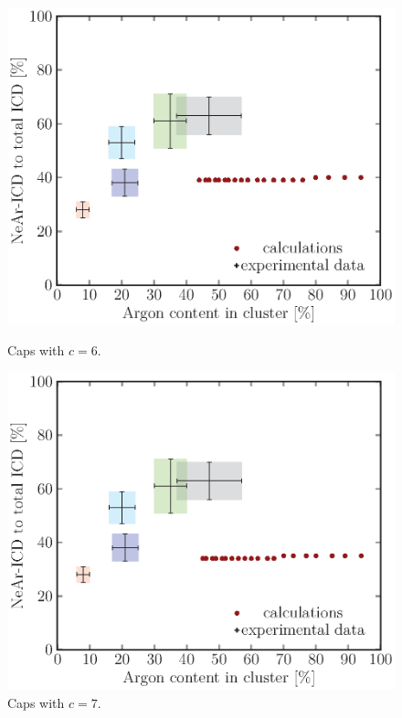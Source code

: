 \begin{figure}[!h]
\begin{minipage}{0.48\textwidth}
    \centering
    \includegraphics[scale=0.5]{pics/caps06.ps}
    \caption{Caps with $c=6$.}
    \label{caps06}
\end{minipage}
\hfill
\begin{minipage}{0.48\textwidth}
    \centering
    \includegraphics[scale=0.5]{pics/caps07.ps}
    \caption{Caps with $c=7$.}
    \label{caps07}
\end{minipage}
\end{figure}

